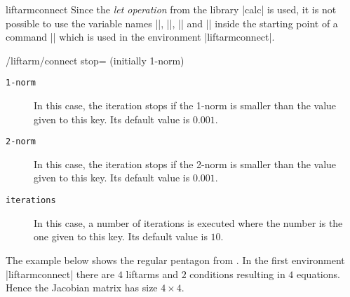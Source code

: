 \documentclass[a4paper,english,dvipsnames]{ltxdoc}
\begin{document}
\begin{environment}{{liftarmconnect}}
Since the \emph{let operation} from the \tikzname{} library |calc| is used, it is not possible to use the variable names |\n|, |\p|, |\x| and |\y| inside the starting point of a command |\liftarm| which is used in the environment |liftarmconnect|.
\begin{key}{/liftarm/connect stop= (initially 1-norm)}
\begin{description}
\item[\texttt{1-norm}] In this case, the iteration stops if the 1-norm is smaller than the value given to this key. Its default value is $0.001$.
\item[\texttt{2-norm}] In this case, the iteration stops if the 2-norm is smaller than the value given to this key. Its default value is $0.001$.
\item[\texttt{iterations}] In this case, a number of iterations is executed where the number is the one given to this key. Its default value is $10$.
\end{description}
\end{key}
\begin{codeexample}[width=10cm]
\end{codeexample}
The example below shows the regular pentagon from \cite{Tmm1}. In the first environment |liftarmconnect| there are $4$ liftarms and $2$ conditions resulting in $4$ equations. Hence the Jacobian matrix has size $4\times 4$.
\begin{codeexample}[width=7cm]
\end{codeexample}
\end{environment}
\end{document}
